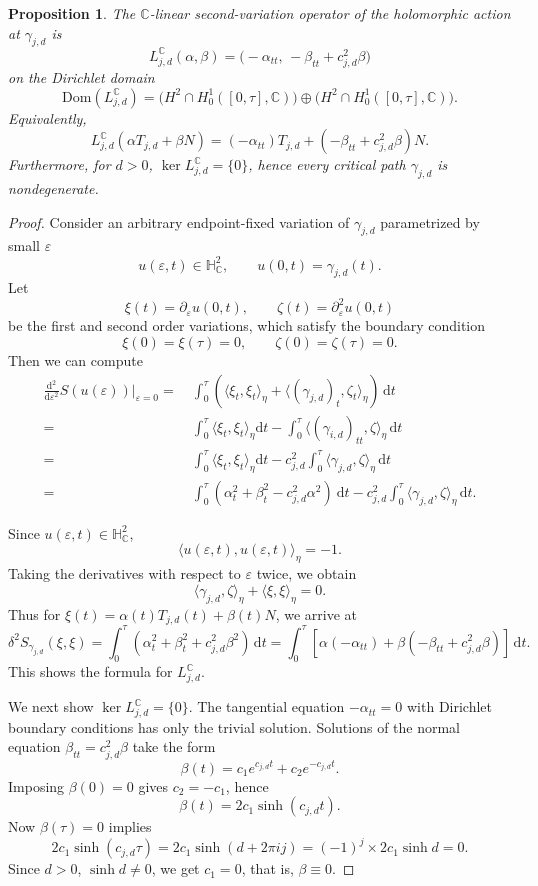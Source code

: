 \documentclass[11pt]{amsart}
\theoremstyle{plain}
\newtheorem{prop}[thm]{Proposition}
\theoremstyle{definition}
\newcommand{\C}{\mathbb{C}}
\newcommand{\dd}{\mathrm d}
\newcommand{\HH}{\mathbb{H}}
\begin{document}
\begin{prop}\label{prop:nondegenerate}
The $\C$-linear second-variation operator of the holomorphic action at $\gamma_{j,d}$ is
\begin{equation*}\label{eq:Ajd}
L_{j,d}^{\C}(\alpha,\beta)=\bigl(-\alpha_{tt},\,-\beta_{tt}+c_{j,d}^2\beta\bigr)
\end{equation*}
on the Dirichlet domain
\[
\mathrm{Dom}(L_{j,d}^{\C})=\bigl(H^2\cap H^1_0([0,\tau],\C)\bigr)\oplus \bigl(H^2\cap H^1_0([0,\tau],\C)\bigr).
\]
Equivalently,
\[
L_{j,d}^{\C}(\alpha T_{j,d}+\beta N)=(-\alpha_{tt})T_{j,d}+(-\beta_{tt}+c_{j,d}^2\beta)N.
\]
Furthermore, for $d>0$, $\ker L_{j,d}^{\C}=\{0\}$, hence every critical path $\gamma_{j,d}$ is nondegenerate. 
\end{prop}


\begin{proof} 
Consider an arbitrary endpoint-fixed variation of $\gamma_{j,d}$ parametrized by small $\varepsilon$
\[u(\varepsilon,t)\in \HH_{\C}^2,\qquad u(0,t)=\gamma_{j,d}(t).\]
Let
\[\xi(t)=\partial_{\varepsilon}u(0,t),\qquad \zeta(t)=\partial_{\varepsilon}^2u(0,t)\]
be the first and second order variations, which satisfy the boundary condition
\[\xi(0)=\xi(\tau)=0,\qquad \zeta(0)=\zeta(\tau)=0.\]
Then we can compute
\begin{align*}
    \frac{\dd^2}{\dd\varepsilon^2}S(u(\varepsilon))\big|_{\varepsilon=0}=~&\int_0^{\tau}\left(\langle\xi_t,\xi_t\rangle_{\eta}+\langle(\gamma_{j,d})_t,\zeta_t\rangle_{\eta}\right)\,\dd t\\
    =~&\int_0^{\tau}\langle\xi_t,\xi_t\rangle_{\eta}\dd t-\int_0^{\tau}\langle(\gamma_{i,d})_{tt},\zeta\rangle_{\eta}\,\dd t\\
    =~&\int_0^{\tau}\langle\xi_t,\xi_t\rangle_{\eta}\dd t-c_{j,d}^2\int_0^{\tau}\langle\gamma_{j,d},\zeta\rangle_{\eta}\,\dd t\\
       =~&\int_0^{\tau}(\alpha_t^2+\beta_t^2-c_{j,d}^2 \alpha^2)\ \dd t-c_{j,d}^2\int_0^{\tau}\langle\gamma_{j,d},\zeta\rangle_{\eta}\,\dd t.
\end{align*}

Since $u(\varepsilon,t)\in\HH_{\C}^2$, 
\[\langle u(\varepsilon,t),u(\varepsilon,t)\rangle_{\eta}=-1.\]
Taking the derivatives with respect to $\varepsilon$ twice, we obtain
\[\langle\gamma_{j,d},\zeta\rangle_{\eta}+\langle\xi,\xi\rangle_{\eta}=0.\]
Thus for $\xi(t)=\alpha(t)T_{j,d}(t)+\beta(t)N$, we arrive at
\[\delta^2S_{\gamma_{j,d}}(\xi,\xi)=\int_0^{\tau}\left(\alpha_t^2+\beta_t^2+c_{j,d}^2\beta^2\right)\,\dd t=\int_0^{\tau}[\alpha(-\alpha_{tt})+\beta(-\beta_{tt}+c_{j,d}^2\beta)]\,\dd t.\]
This shows the formula for $L_{j,d}^{\C}$. 

We next show $\ker L_{j,d}^{\C}=\{0\}$. The tangential equation $-\alpha_{tt}=0$ with Dirichlet boundary conditions has only the trivial solution. Solutions of the normal equation $\beta_{tt}=c_{j,d}^2\beta$
take the form 
\[\beta(t)=c_1 e^{c_{j,d}t}+c_2 e^{-c_{j,d}t}.\] 
Imposing $\beta(0)=0$ gives $c_2=-c_1$, hence
\[
\beta(t)=2c_1\sinh(c_{j,d}t).
\]
Now $\beta(\tau)=0$ implies
\[
2c_1\sinh(c_{j,d}\tau)=2c_1\sinh(d+2\pi ij)=(-1)^j\times 2c_1\sinh d=0.
\]
Since $d>0$, $\sinh d\ne0$, we get $c_1=0$, that is, $\beta\equiv 0$.
\end{proof}
\end{document}
